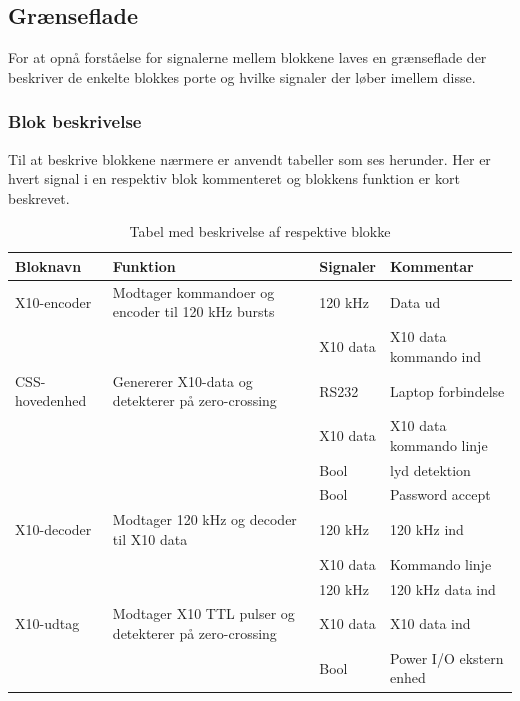 \clearpage
\newpage

\begin{table}[htbp] %
\subsection{Grænseflade}
For at opnå forståelse for signalerne mellem blokkene laves en grænseflade der beskriver de enkelte blokkes porte og hvilke signaler der løber imellem disse.

\subsubsection{Blok beskrivelse}
Til at beskrive blokkene nærmere er anvendt tabeller som ses herunder. Her er hvert signal i en respektiv blok kommenteret og blokkens funktion er kort beskrevet. 

\caption{Tabel med beskrivelse af respektive blokke}
\begin{small}
\begin{tabular}{|p{}|p{}|p{}|p{}|}
\hline
\textbf{Bloknavn} & \textbf{Funktion} & \textbf{Signaler} & \textbf{Kommentar} \\ \hline

X10-encoder & Modtager kommandoer og encoder til 120 kHz bursts & 120 kHz & Data ud \\ \cline{3-4}	
& & X10 data & X10 data kommando ind \\ \hline

CSS-hovedenhed & Genererer X10-data og detekterer på zero-crossing & RS232 & Laptop forbindelse \\ \cline{3-4}
& & X10 data & X10 data kommando linje \\ \cline{3-4}
& & Bool & lyd detektion \\ \cline{3-4}
& & Bool & Password accept \\ \hline

X10-decoder & Modtager 120 kHz og decoder til X10 data & 120 kHz & 120 kHz ind \\ \cline{3-4}
& & X10 data & Kommando linje \\ \cline{3-4}
& & 120 kHz & 120 kHz data ind \\ \hline

X10-udtag & Modtager X10 TTL pulser og detekterer på zero-crossing & X10 data & X10 data ind \\ \cline{3-4}
&& Bool & Power I/O ekstern enhed \\ \hline 
\end{tabular}
\end{small}
\label{table:Bloktabel}
\end{table}

